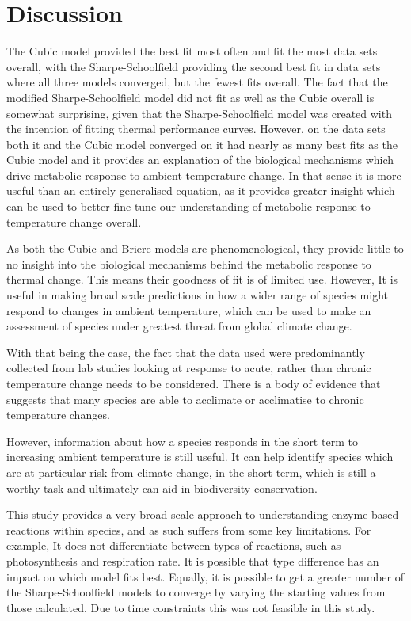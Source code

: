 \documentclass[11pt]{article}
\begin{document}
\section{Discussion}
The Cubic model provided the best fit most often and fit the most data sets overall, with the Sharpe-Schoolfield providing the second best fit in data sets where all three models converged, but the fewest fits overall. The fact that the modified Sharpe-Schoolfield model did not fit as well as the Cubic overall is somewhat surprising, given that the Sharpe-Schoolfield model was created with the intention of fitting thermal performance curves\citep{Schoolfield1981}. However, on the data sets both it and the Cubic model converged on it had nearly as many best fits as the Cubic model and it provides an explanation of the biological mechanisms which drive metabolic response to ambient temperature change. In that sense it is more useful than an entirely generalised equation, as it provides greater insight which can be used to better fine tune our understanding of metabolic response to temperature change overall. 

As both the Cubic and Briere models are phenomenological, they provide little to no insight into the biological mechanisms behind the metabolic response to thermal change. This means their goodness of fit is of limited use. However, It is useful in making broad scale predictions in how a wider range of species might respond to changes in ambient temperature, which can be used to make an assessment of species under greatest threat from global climate change. 

With that being the case, the fact that the data used were predominantly collected from lab studies looking at response to acute, rather than chronic temperature change needs to be considered. There is a body of evidence that suggests that many species are able to acclimate or acclimatise to chronic temperature changes\citep{Schulte2011, Podrabsky2004}. 

However, information about how a species responds in the short term to increasing ambient temperature is still useful. It can help identify species which are at particular risk from climate change, in the short term, which is still a worthy task and ultimately can aid in biodiversity conservation.   

This study provides a very broad scale approach to understanding enzyme based reactions within species, and as such suffers from some key limitations. For example, It does not differentiate between types of reactions, such as photosynthesis and respiration rate. It is possible that type difference has an impact on which model fits best. Equally, it is possible to get a greater number of the Sharpe-Schoolfield models to converge by varying the starting values from those calculated. Due to time constraints this was not feasible in this study. 
\end{document}
